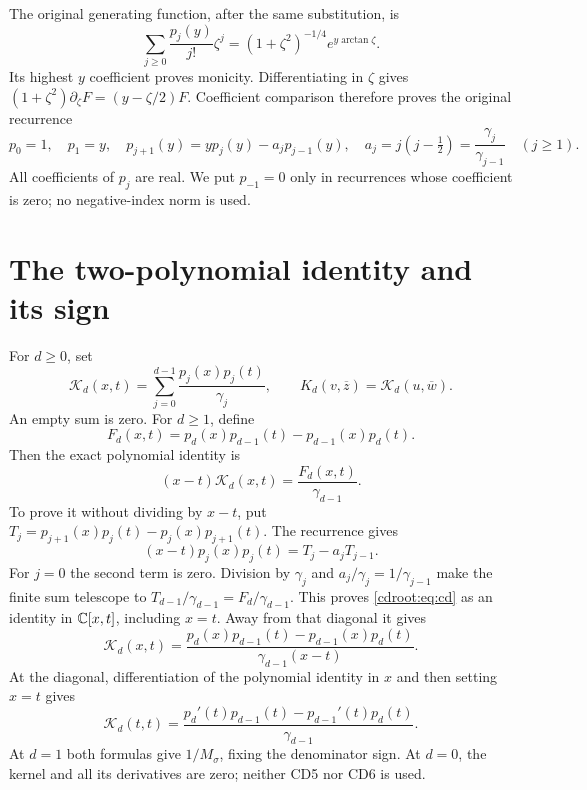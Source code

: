 \documentclass[11pt]{article}
\begin{document}
The original generating function, after the same substitution, is
\[
 \sum_{j\geq0}\frac{p_j(y)}{j!}\zeta^j
 =(1+\zeta^2)^{-1/4}e^{y\arctan\zeta}.
\]
Its highest \(y\) coefficient proves monicity. Differentiating in
\(\zeta\) gives
\((1+\zeta^2)\partial_\zeta F=(y-\zeta/2)F\).
Coefficient comparison therefore proves the original recurrence
\begin{equation}\label{cdroot:eq:recurrence}
 p_0=1,\quad p_1=y,\quad
 p_{j+1}(y)=yp_j(y)-a_jp_{j-1}(y),
 \quad a_j=j(j-\tfrac12)=\frac{\gamma_j}{\gamma_{j-1}}
 \quad(j\geq1).
 \tag{CD3}
\end{equation}
All coefficients of \(p_j\) are real. We put \(p_{-1}=0\) only in
recurrences whose coefficient is zero; no negative-index norm is used.

\section{The two-polynomial identity and its sign}

For \(d\geq0\), set
\[
 \mathcal K_d(x,t)=\sum_{j=0}^{d-1}\frac{p_j(x)p_j(t)}{\gamma_j},
 \qquad K_d(v,\overline z)=\mathcal K_d(u,\overline w).
\]
An empty sum is zero. For \(d\geq1\), define
\[
 F_d(x,t)=p_d(x)p_{d-1}(t)-p_{d-1}(x)p_d(t).
\]
Then the exact polynomial identity is
\begin{equation}\label{cdroot:eq:cd}
 (x-t)\mathcal K_d(x,t)=\frac{F_d(x,t)}{\gamma_{d-1}}.
 \tag{CD4}
\end{equation}
To prove it without dividing by \(x-t\), put
\(T_j=p_{j+1}(x)p_j(t)-p_j(x)p_{j+1}(t)\).
The recurrence gives
\[
 (x-t)p_j(x)p_j(t)=T_j-a_jT_{j-1}.
\]
For \(j=0\) the second term is zero. Division by \(\gamma_j\) and
\(a_j/\gamma_j=1/\gamma_{j-1}\) make the finite sum telescope to
\(T_{d-1}/\gamma_{d-1}=F_d/\gamma_{d-1}\).
This proves \eqref{cdroot:eq:cd} as an identity in \(\mathbb C[x,t]\), including
\(x=t\). Away from that diagonal it gives
\begin{equation}\label{cdroot:eq:offdiagonal}
 \boxed{\mathcal K_d(x,t)=
 \frac{p_d(x)p_{d-1}(t)-p_{d-1}(x)p_d(t)}
      {\gamma_{d-1}(x-t)}.}
 \tag{CD5}
\end{equation}
At the diagonal, differentiation of the polynomial identity in \(x\)
and then setting \(x=t\) gives
\begin{equation}\label{cdroot:eq:diagonal}
 \boxed{\mathcal K_d(t,t)=
 \frac{p_d'(t)p_{d-1}(t)-p_{d-1}'(t)p_d(t)}{\gamma_{d-1}}.}
 \tag{CD6}
\end{equation}
At \(d=1\) both formulas give \(1/M_\sigma\), fixing the denominator
sign. At \(d=0\), the kernel and all its derivatives are zero; neither
CD5 nor CD6 is used.
\end{document}
